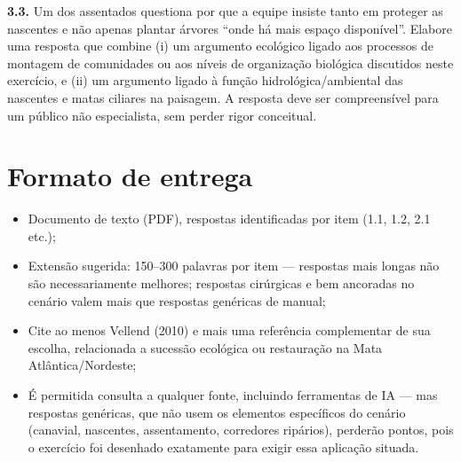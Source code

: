 \documentclass[
  brazilian,
  letterpaper,
  DIV=11,
  numbers=noendperiod]{scrartcl}
\providecommand{\tightlist}{%
  \setlength{\itemsep}{0pt}\setlength{\parskip}{0pt}}
\begin{document}
\textbf{3.3.} Um dos assentados questiona por que a equipe insiste tanto
em proteger as nascentes e não apenas plantar árvores ``onde há mais
espaço disponível''. Elabore uma resposta que combine (i) um argumento
ecológico ligado aos processos de montagem de comunidades ou aos níveis
de organização biológica discutidos neste exercício, e (ii) um argumento
ligado à função hidrológica/ambiental das nascentes e matas ciliares na
paisagem. A resposta deve ser compreensível para um público não
especialista, sem perder rigor conceitual.

\section{Formato de entrega}\label{formato-de-entrega}

\begin{itemize}
\tightlist
\item
  Documento de texto (PDF), respostas identificadas por item (1.1, 1.2,
  2.1 etc.);
\item
  Extensão sugerida: 150--300 palavras por item --- respostas mais
  longas não são necessariamente melhores; respostas cirúrgicas e bem
  ancoradas no cenário valem mais que respostas genéricas de manual;
\item
  Cite ao menos Vellend (2010) e mais uma referência complementar de sua
  escolha, relacionada a sucessão ecológica ou restauração na Mata
  Atlântica/Nordeste;
\item
  É permitida consulta a qualquer fonte, incluindo ferramentas de IA ---
  mas respostas genéricas, que não usem os elementos específicos do
  cenário (canavial, nascentes, assentamento, corredores ripários),
  perderão pontos, pois o exercício foi desenhado exatamente para exigir
  essa aplicação situada.
\end{itemize}
\end{document}
